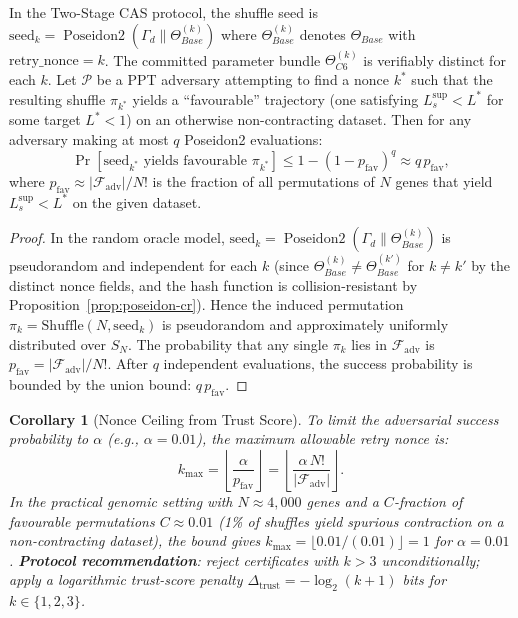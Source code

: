 \documentclass[12pt,letterpaper]{article}
\theoremstyle{definition}
\theoremstyle{plain}
\newtheorem{corollary}[theorem]{Corollary}
\theoremstyle{remark}
\newcommand{\Poseidon}{\operatorname{Poseidon2}}
\newcommand{\Tbase}{\Theta_{Base}}
\newcommand{\TC}{\Theta_{C6}}
\newcommand{\Lsup}{L_s^{\sup}}
\begin{document}
\begin{proposition}
\label{prop:nonce-mining}
In the Two-Stage CAS protocol, the shuffle seed is
$\mathrm{seed}_k = \Poseidon(\Gamma_d \| \Tbase^{(k)})$
where $\Tbase^{(k)}$ denotes $\Tbase$ with $\mathrm{retry\_nonce} = k$.
The committed parameter bundle $\TC^{(k)}$ is verifiably distinct for
each $k$.  Let $\mathcal{P}$ be a PPT adversary attempting to find a
nonce $k^*$ such that the resulting shuffle $\pi_{k^*}$ yields a
``favourable'' trajectory (one satisfying $\Lsup < L^*$ for some
target $L^* < 1$) on an otherwise non-contracting dataset.  Then for
any adversary making at most $q$ Poseidon2 evaluations:
\[
  \Pr[\mathrm{seed}_{k^*}\text{ yields favourable }\pi_{k^*}]
    \le 1 - (1 - p_{\mathrm{fav}})^q
    \approx q\,p_{\mathrm{fav}},
\]
where $p_{\mathrm{fav}} \approx |\mathcal{F}_{\mathrm{adv}}|/N!$ is the
fraction of all permutations of $N$ genes that yield $\Lsup < L^*$ on
the given dataset.
\end{proposition}

\begin{proof}
In the random oracle model, $\mathrm{seed}_k = \Poseidon(\Gamma_d\|\Tbase^{(k)})$
is pseudorandom and independent for each $k$ (since
$\Tbase^{(k)} \ne \Tbase^{(k')}$ for $k \ne k'$ by the distinct nonce fields,
and the hash function is collision-resistant by Proposition~\ref{prop:poseidon-cr}).
Hence the induced permutation $\pi_k = \mathrm{Shuffle}(N, \mathrm{seed}_k)$
is pseudorandom and approximately uniformly distributed over $S_N$.
The probability that any single $\pi_k$ lies in $\mathcal{F}_{\mathrm{adv}}$
is $p_{\mathrm{fav}} = |\mathcal{F}_{\mathrm{adv}}|/N!$.
After $q$ independent evaluations, the success probability is bounded by
the union bound: $q\,p_{\mathrm{fav}}$.
\end{proof}

\begin{corollary}[Nonce Ceiling from Trust Score]
\label{cor:nonce-ceiling}
To limit the adversarial success probability to $\alpha$ (e.g., $\alpha = 0.01$),
the maximum allowable retry nonce is:
\[
  k_{\max} = \left\lfloor \frac{\alpha}{p_{\mathrm{fav}}} \right\rfloor
           = \left\lfloor \frac{\alpha\,N!}{|\mathcal{F}_{\mathrm{adv}}|} \right\rfloor.
\]
In the practical genomic setting with $N \approx 4{,}000$ genes and a
$C$-fraction of favourable permutations $C \approx 0.01$
(1\% of shuffles yield spurious contraction on a non-contracting dataset),
the bound gives $k_{\max} = \lfloor 0.01/(0.01) \rfloor = 1$ for $\alpha=0.01$.
\textbf{Protocol recommendation}: reject certificates with $k > 3$
unconditionally; apply a logarithmic trust-score penalty
$\Delta_{\mathrm{trust}} = -\log_2(k+1)$ bits for $k \in \{1,2,3\}$.
\end{corollary}
\end{document}

